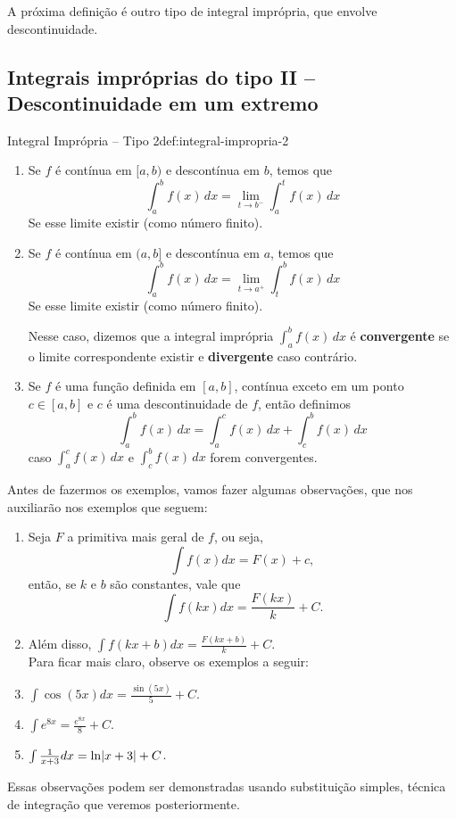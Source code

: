 A próxima definição é outro tipo de integral imprópria,
que envolve descontinuidade.

\subsection{Integrais impróprias do tipo II -- Descontinuidade em um extremo}

\begin{definicao}{Integral Imprópria -- Tipo 2}{def:integral-impropria-2}
\begin{enumerate}

\item Se $f$ é contínua em $[a, b)$ e descontínua em $b$,
  temos que
  \[
  \int_a^b f(x)\,dx = \lim_{t\to b^{-}} \int_a^t f(x)\,dx
  \]
  Se esse limite existir (como número finito).

\item   Se $f$ é contínua em $(a, b]$ e descontínua em $a$,
  temos que
  \[
    \int_a^b f(x)\,dx = \lim_{t\to a^{+}} \int_t^b f(x)\,dx
  \]
  Se esse limite existir (como número finito).

  Nesse caso, dizemos que a integral imprópria $\int_a^b f(x)\,dx$ é
  \textbf{convergente} se o limite correspondente existir e \textbf{divergente}
  caso contrário.
\item  Se $f$ é uma função definida em $[a, b]$, contínua exceto em um ponto
  $c \in [a, b]$ e $c$ é uma descontinuidade de $f$, então definimos
  \[
    \int_a^b f(x) \, dx = \int_a^c f(x) \, dx + \int_c^b f(x) \, dx
  \]
  caso \(\int_a^c f(x)\,dx\) e \(\int_c^b f(x)\,dx\) forem convergentes.
  \end{enumerate}
\end{definicao}

Antes de fazermos os exemplos, vamos fazer algumas observações,
que nos auxiliarão nos exemplos que seguem:
\begin{enumerate}
  \item Seja $F$ a primitiva mais geral de $f$, ou seja,
  \[
    \int f(x)dx= F(x)+c,
  \]
    então, se $k$ e $b$ são constantes, vale que
  \[
    \int f(kx) dx= \frac{F(kx)}{k}+C.
  \]
  \item Além disso, \(\int f(kx+b)dx= \frac{F(kx+b)}{k}+C\). \\
  Para ficar mais claro, observe os exemplos a seguir:

  \item \(\int \cos(5x) dx= \frac{\sin(5x)}{5}+C\).

  \item \(\int e^{8x}= \frac{e^{8x}}{8}+C\).

  \item \(\int \frac{1}{x+3}dx= \ln\abs{x+3}+C\).

\end{enumerate}
Essas observações podem ser demonstradas usando substituição simples,
técnica de integração que veremos posteriormente.

